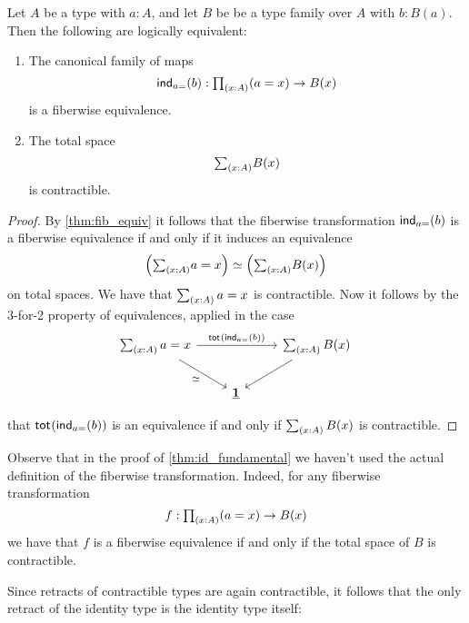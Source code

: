\begin{thm}\label{thm:id_fundamental}
Let $A$ be a type with $a:A$, and let $B$ be be a type family over $A$ with $b:B(a)$.
Then  the following are logically equivalent:
\begin{enumerate}
\item The canonical family of maps
\begin{equation*}
\ind{a{=}}(b):\prd{x:A} (a=x)\to B(x)
\end{equation*}
is a fiberwise equivalence.
\item The total space
\begin{equation*}
\sm{x:A}B(x)
\end{equation*}
is contractible.
\end{enumerate}
\end{thm}

\begin{proof}
By \autoref{thm:fib_equiv} it follows that the fiberwise transformation $\mathsf{ind}_{a{=}}(b)$ is a fiberwise equivalence if and only if it induces an equivalence
\begin{equation*}
\eqv{\Big(\sm{x:A}a=x\Big)}{\Big(\sm{x:A}B(x)\Big)}
\end{equation*}
on total spaces. We have that $\sm{x:A}a=x$ is contractible. Now it follows by the 3-for-2 property of equivalences, applied in the case
\begin{equation*}
\begin{tikzcd}
\sm{x:A}a=x \arrow[rr,"\total{\ind{a{=}}(b)}"] \arrow[dr,swap,"\eqvsym"] & & \sm{x:A}B(x) \arrow[dl] \\
& \unit & \phantom{\sm{x:A}a=x}
\end{tikzcd}
\end{equation*}
that $\mathsf{tot}_{}(\mathsf{ind}_{a{=}}(b))$ is an equivalence if and only if $\sm{x:A}B(x)$ is contractible.
\end{proof}

Observe that in the proof of \cref{thm:id_fundamental} we haven't used the actual definition of the fiberwise transformation. Indeed, for any fiberwise transformation
\begin{equation*}
f:\prd{x:A}(a=x)\to B(x)
\end{equation*}
we have that $f$ is a fiberwise equivalence if and only if the total space of $B$ is contractible.

Since retracts of contractible types are again contractible, it follows that the only retract of the identity type is the identity type itself:

